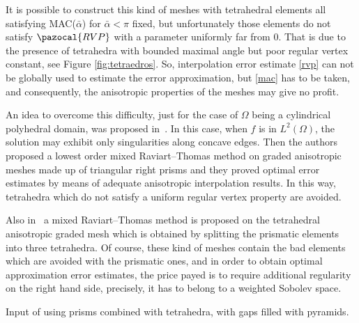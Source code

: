 It is possible to construct this
kind of meshes with tetrahedral elements all satisfying MAC($\bar\alpha$) for $\bar\alpha<\pi$ fixed, but unfortunately those 
elements do not satisfy $\pazocal{RVP}$ with a parameter uniformly far from $0$. That is 
due to the presence of tetrahedra with bounded 
maximal angle but poor regular vertex constant, see Figure \ref{fig:tetraedros}. So, interpolation error estimate \eqref{rvp} 
can not be globally used to estimate the error approximation, but \eqref{mac} has to be taken, and consequently, 
the anisotropic properties of the meshes may give no profit.  

\tetsTikz

An idea to overcome this difficulty, just for the case of $\Omega$ being a 
cylindrical polyhedral domain, 
was proposed in~\cite{MR1866274}. In  this case, when $f$ is in $L^2(\Omega)$, 
the solution may exhibit only singularities along concave edges.
Then the authors proposed a lowest order mixed Raviart--Thomas method on graded 
anisotropic meshes made up of triangular right prisms and they proved optimal error 
estimates by means of adequate anisotropic interpolation results. 
In this way, tetrahedra which do not satisfy a
uniform regular vertex property are avoided.

Also in~\cite{MR1866274} a mixed Raviart--Thomas method is 
proposed on the tetrahedral 
anisotropic graded mesh which is obtained by splitting the prismatic elements 
into three tetrahedra. Of course, these kind of meshes contain the bad elements 
which are avoided with the prismatic ones, and in order to obtain optimal 
approximation error estimates, the price payed is to require additional regularity 
on the right hand side, precisely, it has to belong to a weighted Sobolev space.

Input of using prisms combined with tetrahedra, with gaps filled with pyramids.

